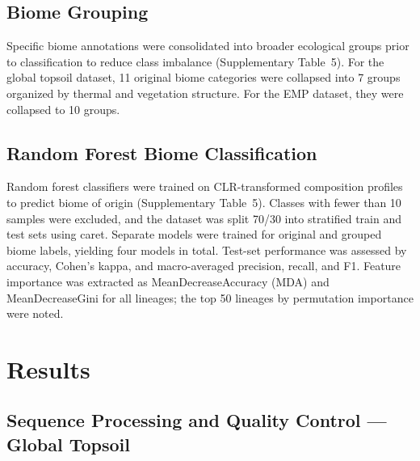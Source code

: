 \documentclass[12pt, oneside]{report}
\begin{document}
\section{Biome Grouping}
\label{sec:biome-grouping}

Specific biome annotations were consolidated into broader ecological groups prior to
classification to reduce class imbalance (Supplementary Table~5). For the global topsoil
dataset, 11 original biome categories were collapsed into 7 groups organized by thermal
and vegetation structure. For the EMP dataset, they were collapsed to 10 groups.

\section{Random Forest Biome Classification}
\label{sec:rf}

Random forest classifiers\cite{breiman2001} were trained on
CLR-transformed composition profiles to predict biome of origin (Supplementary Table~5).
Classes with fewer than 10 samples were excluded, and the dataset was split 70/30 into
stratified train and test sets using caret. Separate models were trained for original and grouped
biome labels, yielding four models in total. Test-set performance was assessed by accuracy,
Cohen's kappa, and macro-averaged precision, recall, and F1. Feature importance was extracted
as MeanDecreaseAccuracy (MDA) and MeanDecreaseGini for all lineages; the top 50 lineages
by permutation importance were noted.

\chapter{Results}

\section{Sequence Processing and Quality Control — Global Topsoil}
\label{res:seqproc}
\end{document}
